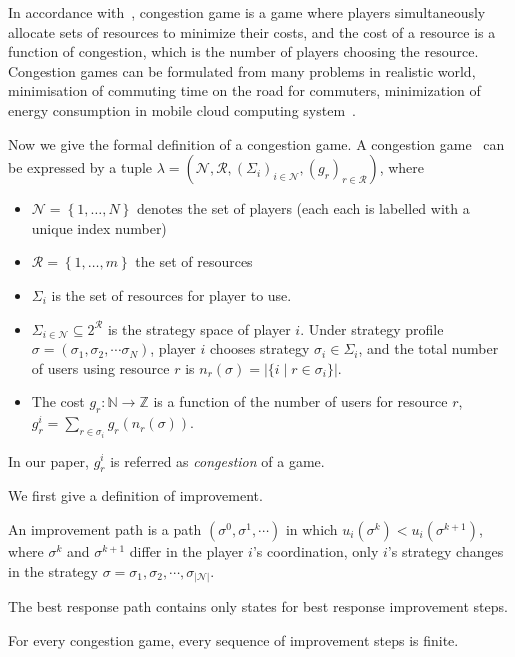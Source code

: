 In accordance with~\cite{Voecking06congestiongames}, congestion game is a game where players simultaneously allocate sets of resources to minimize their costs, and the cost of a resource is a function of congestion, which is the number of players choosing the resource.
Congestion games can be formulated from many problems in realistic world, \eg minimisation of commuting time on the road for commuters, minimization of energy consumption in mobile cloud computing system~\cite{game_cloudcomputing_energy12}.


Now we give the formal definition of a congestion game.
A congestion game~\cite{Rosenthal}\cite{Voecking06congestiongames} can be expressed by a tuple $\lambda=(\mathcal{N},\mathcal{R},(\Sigma_i)_{i \in \mathcal{N}},(g_r)_{r\in \mathcal{R}})$, where
\begin{itemize}
\item $\mathcal{N}=\left\{1,\ldots,N\right\}$ denotes the set of players (each each is labelled with a unique index number)
\item $\mathcal{R}=\left\{1,\ldots,m\right\}$ the set of resources
\item $\Sigma_i$ is the set of resources for player to use.
\item $\Sigma_{i\in\mathcal{N}} \subseteq 2^{\mathcal{R}}$ is the strategy space of player $i$. 
Under strategy profile $\sigma=(\sigma_1,\sigma_2,\cdots \sigma_N)$, player $i$ chooses strategy $\sigma_i\in \Sigma_i$, and the total number of users using resource $r$ is $n_r(\sigma)=|\{i\mid r\in \sigma_i\}|$. 
\item The cost $g_r: \mathbb{N}\rightarrow \mathbb{Z}$ is a function of the number of users for resource $r$, $g_r^i=\sum_{r\in \sigma_i} g_r(n_r(\sigma))$. 
\end{itemize}
In our paper, $g_r^i$ is referred as \textit{congestion} of a game.

We first give a definition of improvement.
\begin{mydef}
An improvement path is a path $(\sigma^0, \sigma^1, \cdots)$ in which $u_i(\sigma^k) < u_i(\sigma^{k+1}) $, where $\sigma^k$ and $\sigma^{k+1}$ differ in the player $i$'s coordination, \ie only $i$'s strategy changes in the strategy $\sigma={\sigma_1, \sigma_2, \cdots, \sigma_{|\mathcal{N}|}}$.
\end{mydef}
The best response path contains only states for best response improvement steps.


\begin{theorem}
\label{background:finiteImprovement}
For every congestion game, every sequence of improvement steps is finite.~\cite{Rosenthal}
\end{theorem}

